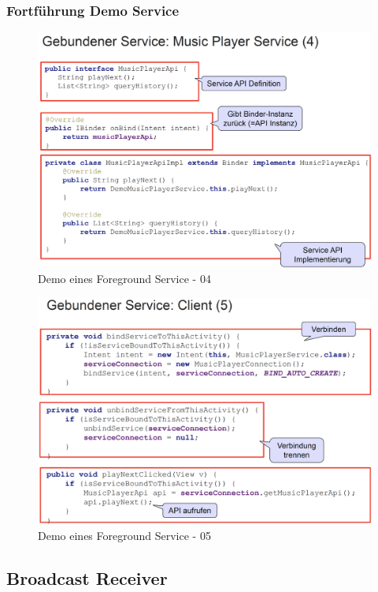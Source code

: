 \documentclass[a4paper]{article}
\begin{document}
		\newpage
		
		\subsubsection{Fortführung Demo Service}
		
		\begin{figure}[!htb]
			\centering
			\includegraphics[width=.8\textwidth]{img/service_demo04.png}
			\caption{Demo eines Foreground Service - 04}
			\label{fig:service_demo_04}
		\end{figure}
	
		\begin{figure}[!htb]
			\centering
			\includegraphics[width=.8\textwidth]{img/service_demo05.png}
			\caption{Demo eines Foreground Service - 05}
			\label{fig:service_demo_05}
		\end{figure}
	
	\newpage
	
	\subsection{Broadcast Receiver}
	
\end{document}
